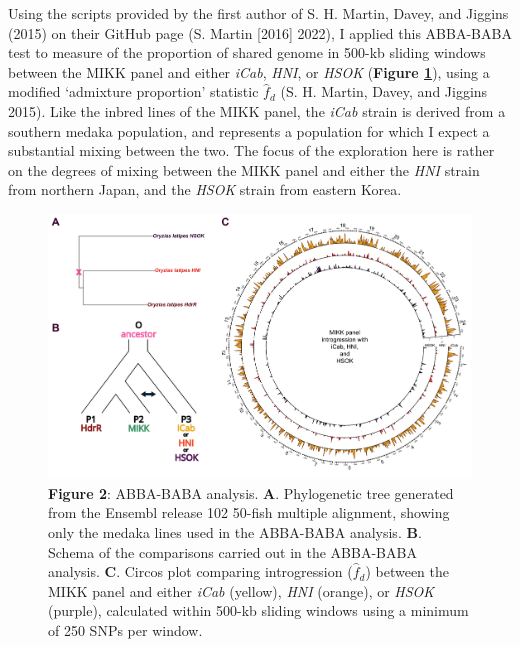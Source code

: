 \documentclass[
]{book}
\begin{document}
Using the scripts provided by the first author of S. H. Martin, Davey, and Jiggins (2015) on their GitHub page (S. Martin {[}2016{]} 2022), I applied this ABBA-BABA test to measure of the proportion of shared genome in 500-kb sliding windows between the MIKK panel and either \emph{iCab}, \emph{HNI}, or \emph{HSOK} (\textbf{Figure \ref{fig:ABBABABA}}), using a modified `admixture proportion' statistic \(\hat{f}_d\) (S. H. Martin, Davey, and Jiggins 2015). Like the inbred lines of the MIKK panel, the \emph{iCab} strain is derived from a southern medaka population, and represents a population for which I expect a substantial mixing between the two. The focus of the exploration here is rather on the degrees of mixing between the MIKK panel and either the \emph{HNI} strain from northern Japan, and the \emph{HSOK} strain from eastern Korea.



\begin{figure}
\includegraphics[width=1\linewidth]{figs/mikk_genome/07_introgression} \caption{\textbf{Figure 2}: ABBA-BABA analysis. \textbf{A}. Phylogenetic tree generated from the Ensembl release 102 50-fish multiple alignment, showing only the medaka lines used in the ABBA-BABA analysis. \textbf{B}. Schema of the comparisons carried out in the ABBA-BABA analysis. \textbf{C}. Circos plot comparing introgression (\(\hat{f}_d\)) between the MIKK panel and either \emph{iCab} (yellow), \emph{HNI} (orange), or \emph{HSOK} (purple), calculated within 500-kb sliding windows using a minimum of 250 SNPs per window.}\label{fig:ABBABABA}
\end{figure}
\end{document}
